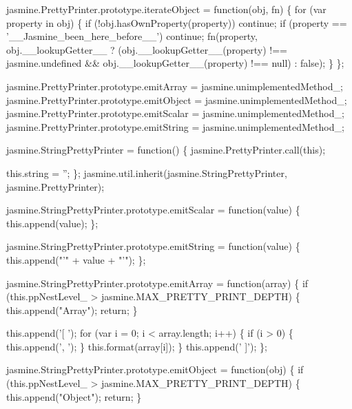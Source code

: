 \begin{DoxyCodeInclude}
jasmine.PrettyPrinter.prototype.iterateObject = \textcolor{keyword}{function}(obj, fn) \{
  \textcolor{keywordflow}{for} (var property in obj) \{
    \textcolor{keywordflow}{if} (!obj.hasOwnProperty(property)) \textcolor{keywordflow}{continue};
    \textcolor{keywordflow}{if} (property == \textcolor{stringliteral}{'\_\_Jasmine\_been\_here\_before\_\_'}) \textcolor{keywordflow}{continue};
    fn(property, obj.\_\_lookupGetter\_\_ ? (obj.\_\_lookupGetter\_\_(property) !== jasmine.undefined && 
                                         obj.\_\_lookupGetter\_\_(property) !== null) : \textcolor{keyword}{false});
  \}
\};

jasmine.PrettyPrinter.prototype.emitArray = jasmine.unimplementedMethod\_;
jasmine.PrettyPrinter.prototype.emitObject = jasmine.unimplementedMethod\_;
jasmine.PrettyPrinter.prototype.emitScalar = jasmine.unimplementedMethod\_;
jasmine.PrettyPrinter.prototype.emitString = jasmine.unimplementedMethod\_;

jasmine.StringPrettyPrinter = \textcolor{keyword}{function}() \{
  jasmine.PrettyPrinter.call(\textcolor{keyword}{this});

  this.\textcolor{keywordtype}{string} = \textcolor{stringliteral}{''};
\};
jasmine.util.inherit(jasmine.StringPrettyPrinter, jasmine.PrettyPrinter);

jasmine.StringPrettyPrinter.prototype.emitScalar = \textcolor{keyword}{function}(value) \{
  this.append(value);
\};

jasmine.StringPrettyPrinter.prototype.emitString = \textcolor{keyword}{function}(value) \{
  this.append(\textcolor{stringliteral}{"'"} + value + \textcolor{stringliteral}{"'"});
\};

jasmine.StringPrettyPrinter.prototype.emitArray = \textcolor{keyword}{function}(array) \{
  \textcolor{keywordflow}{if} (this.ppNestLevel\_ > jasmine.MAX\_PRETTY\_PRINT\_DEPTH) \{
    this.append(\textcolor{stringliteral}{"Array"});
    \textcolor{keywordflow}{return};
  \}

  this.append(\textcolor{stringliteral}{'[ '});
  \textcolor{keywordflow}{for} (var i = 0; i < array.length; i++) \{
    \textcolor{keywordflow}{if} (i > 0) \{
      this.append(\textcolor{stringliteral}{', '});
    \}
    this.format(array[i]);
  \}
  this.append(\textcolor{stringliteral}{' ]'});
\};

jasmine.StringPrettyPrinter.prototype.emitObject = \textcolor{keyword}{function}(obj) \{
  \textcolor{keywordflow}{if} (this.ppNestLevel\_ > jasmine.MAX\_PRETTY\_PRINT\_DEPTH) \{
    this.append(\textcolor{stringliteral}{"Object"});
    \textcolor{keywordflow}{return};
  \}


\end{DoxyCodeInclude}

